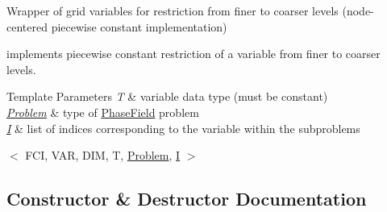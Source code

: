 Wrapper of grid variables for restriction from finer to coarser levels (node-\/centered piecewise constant implementation) 

implements piecewise constant restriction of a variable from finer to coarser levels.


\begin{DoxyTemplParams}{Template Parameters}
{\em T} & variable data type (must be constant) \\
\hline
{\em \hyperlink{classUintah_1_1PhaseField_1_1Problem}{Problem}} & type of \hyperlink{namespaceUintah_1_1PhaseField}{Phase\+Field} problem \\
\hline
{\em \hyperlink{structUintah_1_1PhaseField_1_1I}{I}} & list of indices corresponding to the variable within the subproblems\\
\hline
\end{DoxyTemplParams}
$<$ F\+CI, V\+AR, D\+IM, T, \hyperlink{classUintah_1_1PhaseField_1_1Problem}{Problem}, \hyperlink{structUintah_1_1PhaseField_1_1I}{I} $>$ 

\subsection{Constructor \& Destructor Documentation}
\mbox{\label{classUintah_1_1PhaseField_1_1detail_1_1amr__restrictor_3_01ScalarField_3_01T_01_4_00_01Problem_05760ee5d1d3adcc969b3f56f71e72acb_a9d8bbe1e77519c3e16e93d047a231da5}} 
